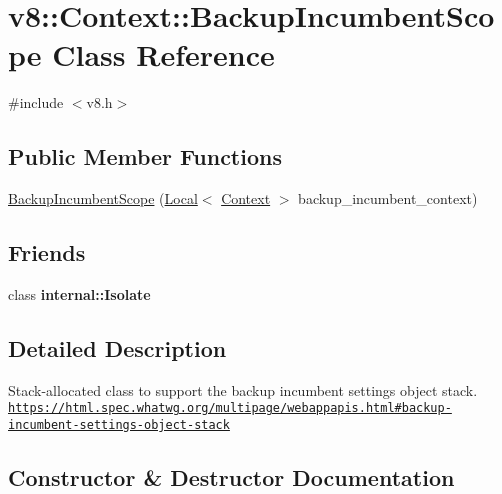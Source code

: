\hypertarget{classv8_1_1Context_1_1BackupIncumbentScope}{}\section{v8\+:\+:Context\+:\+:Backup\+Incumbent\+Scope Class Reference}
\label{classv8_1_1Context_1_1BackupIncumbentScope}


{\ttfamily \#include $<$v8.\+h$>$}

\subsection*{Public Member Functions}
\begin{DoxyCompactItemize}
\item 
\mbox{\hyperlink{classv8_1_1Context_1_1BackupIncumbentScope_a0e5f36411216cdff0150156281b52d00}{Backup\+Incumbent\+Scope}} (\mbox{\hyperlink{classv8_1_1Local}{Local}}$<$ \mbox{\hyperlink{classv8_1_1Context}{Context}} $>$ backup\+\_\+incumbent\+\_\+context)
\end{DoxyCompactItemize}
\subsection*{Friends}
\begin{DoxyCompactItemize}
\item 
\mbox{\label{classv8_1_1Context_1_1BackupIncumbentScope_a438c8b784134d31d7a50bc60098d8ba1}} 
class {\bfseries internal\+::\+Isolate}
\end{DoxyCompactItemize}


\subsection{Detailed Description}
Stack-\/allocated class to support the backup incumbent settings object stack. \href{https://html.spec.whatwg.org/multipage/webappapis.html#backup-incumbent-settings-object-stack}{\tt https\+://html.\+spec.\+whatwg.\+org/multipage/webappapis.\+html\#backup-\/incumbent-\/settings-\/object-\/stack} 

\subsection{Constructor \& Destructor Documentation}
\mbox{\label{classv8_1_1Context_1_1BackupIncumbentScope_a0e5f36411216cdff0150156281b52d00}} 
